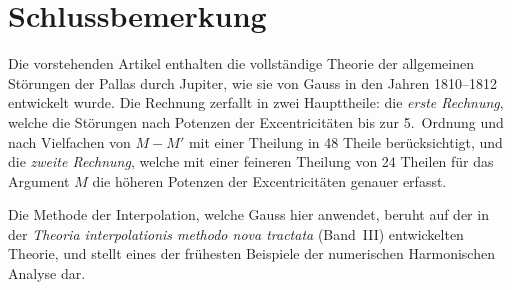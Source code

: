 \documentclass[12pt,a4paper]{article}
\begin{document}
\normalsize

\clearpage
\section*{Schlussbemerkung}

Die vorstehenden Artikel enthalten die vollständige Theorie der allgemeinen Störungen der Pallas durch Jupiter, wie sie von Gauss in den Jahren 1810--1812 entwickelt wurde. Die Rechnung zerfallt in zwei Haupttheile: die \textit{erste Rechnung}, welche die Störungen nach Potenzen der Excentricitäten bis zur 5.~Ordnung und nach Vielfachen von $M-M'$ mit einer Theilung in 48 Theile berücksichtigt, und die \textit{zweite Rechnung}, welche mit einer feineren Theilung von 24 Theilen für das Argument $M$ die höheren Potenzen der Excentricitäten genauer erfasst.

Die Methode der Interpolation, welche Gauss hier anwendet, beruht auf der in der \textit{Theoria interpolationis methodo nova tractata} (Band~III) entwickelten Theorie, und stellt eines der frühesten Beispiele der numerischen Harmonischen Analyse dar.
\end{document}
